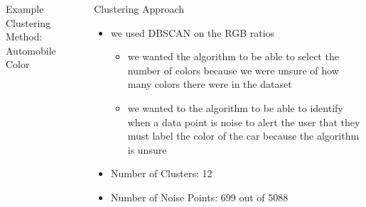 \documentclass[final]{beamer}
\newlength{\restofpage}
\begin{document}
\begin{frame}[t]
\begin{columns}[t]
\begin{column}{\restofpage}
\begin{columns}[c]
\begin{block}{Example Clustering Method: \newline Automobile Color}
\begin{itemize}
            \end{itemize}
        \end{block}

        \begin{block}{Clustering Approach}
          \begin{itemize}
            \item we used DBSCAN on the RGB ratios
              \begin{itemize}
                \item we wanted the algorithm to be able to select the number of colors because we were unsure of how many colors there were in the dataset
                \item we wanted to the algorithm to be able to identify when a data point is noise to alert the user that they must label the color of the car because the algorithm is unsure
              \end{itemize}
            \item Number of Clusters: 12
            \item Number of Noise Points: 699 out of 5088
          \end{itemize}
        \end{block}


\end{columns}
\end{column}
\end{columns}
\end{frame}
\end{document}
